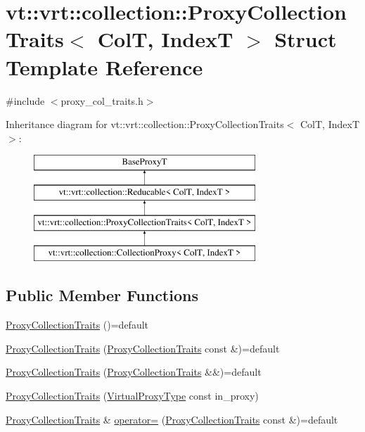 \hypertarget{structvt_1_1vrt_1_1collection_1_1_proxy_collection_traits}{}\section{vt\+:\+:vrt\+:\+:collection\+:\+:Proxy\+Collection\+Traits$<$ ColT, IndexT $>$ Struct Template Reference}
\label{structvt_1_1vrt_1_1collection_1_1_proxy_collection_traits}


{\ttfamily \#include $<$proxy\+\_\+col\+\_\+traits.\+h$>$}

Inheritance diagram for vt\+:\+:vrt\+:\+:collection\+:\+:Proxy\+Collection\+Traits$<$ ColT, IndexT $>$\+:\begin{figure}[H]
\begin{center}
\leavevmode
\includegraphics[height=4.000000cm]{structvt_1_1vrt_1_1collection_1_1_proxy_collection_traits}
\end{center}
\end{figure}
\subsection*{Public Member Functions}
\begin{DoxyCompactItemize}
\item 
\hyperlink{structvt_1_1vrt_1_1collection_1_1_proxy_collection_traits_a2dd8fe584f3a88035deebce13902f470}{Proxy\+Collection\+Traits} ()=default
\item 
\hyperlink{structvt_1_1vrt_1_1collection_1_1_proxy_collection_traits_a004719bb3273ae561bb97ab0ef63d4ff}{Proxy\+Collection\+Traits} (\hyperlink{structvt_1_1vrt_1_1collection_1_1_proxy_collection_traits}{Proxy\+Collection\+Traits} const \&)=default
\item 
\hyperlink{structvt_1_1vrt_1_1collection_1_1_proxy_collection_traits_af8c270e30f87c1247a811b6116c3622c}{Proxy\+Collection\+Traits} (\hyperlink{structvt_1_1vrt_1_1collection_1_1_proxy_collection_traits}{Proxy\+Collection\+Traits} \&\&)=default
\item 
\hyperlink{structvt_1_1vrt_1_1collection_1_1_proxy_collection_traits_a2fec1dfd064e656c8167bee07b9c3918}{Proxy\+Collection\+Traits} (\hyperlink{namespacevt_a1b417dd5d684f045bb58a0ede70045ac}{Virtual\+Proxy\+Type} const in\+\_\+proxy)
\item 
\hyperlink{structvt_1_1vrt_1_1collection_1_1_proxy_collection_traits}{Proxy\+Collection\+Traits} \& \hyperlink{structvt_1_1vrt_1_1collection_1_1_proxy_collection_traits_a1765ee2517b39f1fe0b1168556071afd}{operator=} (\hyperlink{structvt_1_1vrt_1_1collection_1_1_proxy_collection_traits}{Proxy\+Collection\+Traits} const \&)=default
\end{DoxyCompactItemize}

